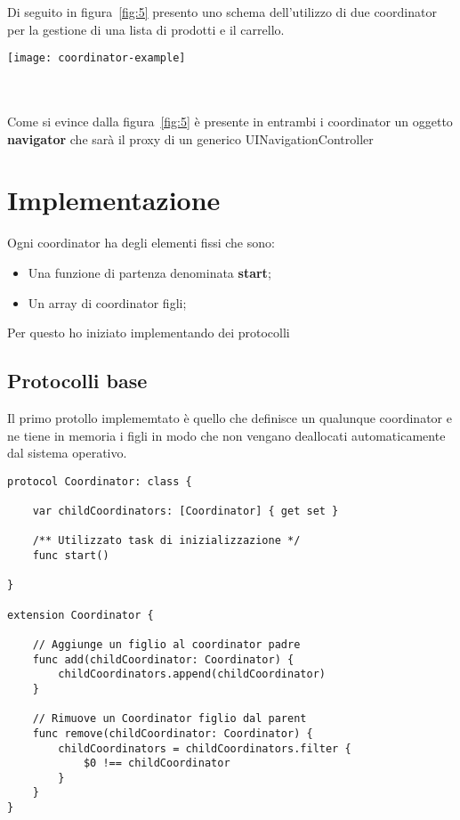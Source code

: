 Di seguito in figura~\ref{fig:5} presento uno schema dell'utilizzo di due coordinator
per la gestione di una lista di prodotti e il carrello. \\

\begin{minipage}{\linewidth}
    \centering
    \texttt{[image: coordinator-example]}
    \label{fig:5}
\end{minipage}\\ \\

Come si evince dalla figura~\ref{fig:5} è presente in entrambi i coordinator un oggetto
\textbf{navigator} che sarà il proxy di un generico UINavigationController

\section{Implementazione}

Ogni coordinator ha degli elementi fissi che sono:

\begin{itemize}
    \item Una funzione di partenza denominata \textbf{start};
    \item Un array di coordinator figli;
\end{itemize}

Per questo ho iniziato implementando dei protocolli
\subsection{Protocolli base}

Il primo protollo implememtato è quello che definisce un qualunque coordinator
e ne tiene in memoria i figli in modo che non vengano
deallocati automaticamente dal sistema operativo.

\begin{verbatim}
protocol Coordinator: class {

    var childCoordinators: [Coordinator] { get set }
    
    /** Utilizzato task di inizializzazione */
    func start()
    
}

extension Coordinator {
    
    // Aggiunge un figlio al coordinator padre
    func add(childCoordinator: Coordinator) {
        childCoordinators.append(childCoordinator)
    }
    
    // Rimuove un Coordinator figlio dal parent
    func remove(childCoordinator: Coordinator) {
        childCoordinators = childCoordinators.filter {
            $0 !== childCoordinator 
        }
    }
}
\end{verbatim}

